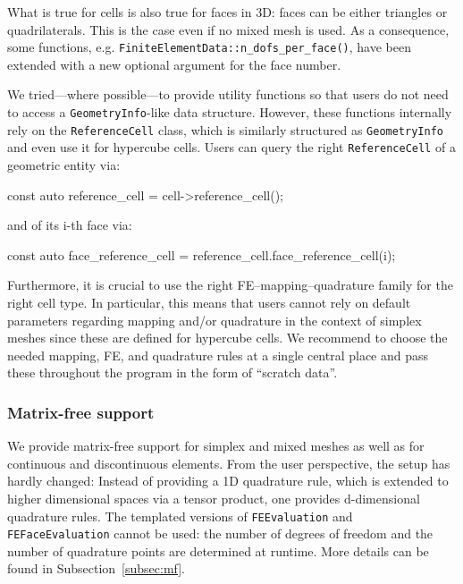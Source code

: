 \documentclass{ansarticle-preprint}
\begin{document}
What is true for cells is also true for faces in 3D: faces can be either triangles
or quadrilaterals. This is the case even if no mixed mesh is used. As a consequence, some functions, e.g. \texttt{FiniteElementData::n\_dofs\_per\_face()}, have been extended with a new optional argument for the face number.

We tried---where possible---to provide utility functions so that users do not need to access a \texttt{GeometryInfo}-like data structure. However, these functions internally rely on the \texttt{ReferenceCell} class, which is similarly structured as \texttt{GeometryInfo} and even use it for hypercube cells. Users can query the right \texttt{ReferenceCell} of a geometric entity via:
\begin{c++}
const auto reference_cell = cell->reference_cell();
\end{c++}
and of its i-th face via:
\begin{c++}
const auto face_reference_cell = reference_cell.face_reference_cell(i);
\end{c++}


Furthermore, it is crucial to use the right FE--mapping--quadrature family
for the right cell type. In particular, this means that users cannot
rely on default parameters regarding mapping and/or quadrature in the
context of simplex meshes since these are defined for hypercube cells.
We recommend to choose the needed mapping,
FE, and quadrature rules at a single central place and pass these throughout the program
in the form of ``scratch data''.

\subsubsection{Matrix-free support}

We provide matrix-free support for simplex and mixed meshes as well as for
continuous and discontinuous elements. From the user perspective, the setup has
hardly changed:
%
Instead of providing a 1D quadrature rule, which is extended to higher dimensional
spaces via a tensor product, one provides d-dimensional quadrature rules.
The templated versions of \texttt{FEEvaluation} and \texttt{FEFaceEvaluation} cannot be used: the number of degrees of freedom and the number of quadrature points are determined at runtime. More details can be found in Subsection~\ref{subsec:mf}.
\end{document}
